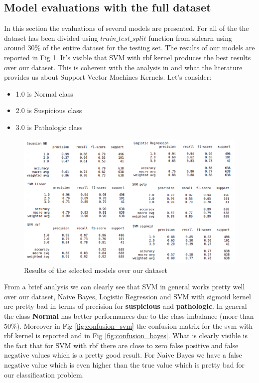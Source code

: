 \documentclass[a4paper,12pt]{article}
\begin{document}
\subsection{Model evaluations with the full dataset}

In this section the evaluations of several models are presented. For all of the the dataset has been divided using $train\_test\_split$ function from sklearn using around 30\% of the entire dataset for the testing set. 
The results of our models are reported in Fig \ref{fig:fulldataset}. It's visible that SVM with rbf kernel produces the best results over our dataset. This is coherent with the analysis in \cite{ml} and what the literature provides us about Support Vector Machines Kernels. Let's consider:
\bigbreak
\begin{itemize}
  \item 1.0 is Normal class
  \item 2.0 is Suspicious class
  \item 3.0 is Pathologic class
\end{itemize} 

\begin{figure}[H]
  \begin{center}
  \includegraphics[width=1.0\textwidth]{images/fulldataset.png}
  \end{center}
  \caption{Results of the selected models over our dataset}
  \label{fig:fulldataset}
\end{figure}

\noindent From a brief analysis we can clearly see that SVM in general works pretty well over our dataset, Naive Bayes, Logistic Regression and SVM with sigmoid kernel are pretty bad in terms of precision for \textbf{suspicious} and \textbf{pathologic}. In general the class \textbf{Normal} has better performances due to the class imbalance (more than 50\%). Moreover in Fig \ref{fig:confusion_svm} the confusion matrix for the svm with rbf kernel is reported and in Fig \ref{fig:confusion_bayes}. What is clearly visible is the fact that for SVM with rbf there are close to zero false positive and false negative values which is a pretty good result. For Naive Bayes we have a false negative value which is even higher than the true value which is pretty bad for our classification problem.
\end{document}
